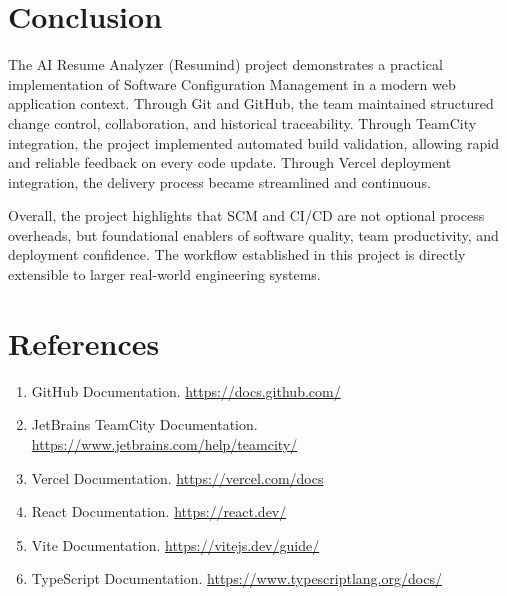 \documentclass[12pt,a4paper]{report}
\begin{document}
\chapter{Conclusion}
The AI Resume Analyzer (Resumind) project demonstrates a practical implementation of Software Configuration Management in a modern web application context. Through Git and GitHub, the team maintained structured change control, collaboration, and historical traceability. Through TeamCity integration, the project implemented automated build validation, allowing rapid and reliable feedback on every code update. Through Vercel deployment integration, the delivery process became streamlined and continuous.

Overall, the project highlights that SCM and CI/CD are not optional process overheads, but foundational enablers of software quality, team productivity, and deployment confidence. The workflow established in this project is directly extensible to larger real-world engineering systems.

\chapter{References}
\begin{enumerate}[leftmargin=1.2cm]
    \item GitHub Documentation. \url{https://docs.github.com/}
    \item JetBrains TeamCity Documentation. \url{https://www.jetbrains.com/help/teamcity/}
    \item Vercel Documentation. \url{https://vercel.com/docs}
    \item React Documentation. \url{https://react.dev/}
    \item Vite Documentation. \url{https://vitejs.dev/guide/}
    \item TypeScript Documentation. \url{https://www.typescriptlang.org/docs/}
\end{enumerate}
\end{document}
